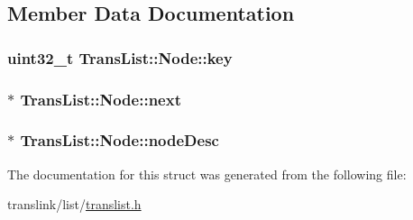 \subsection{Member Data Documentation}
\hypertarget{structTransList_1_1Node_a975055011359376eff958b309b0b553f}{
\subsubsection[{key}]{\setlength{\rightskip}{0pt plus 5cm}uint32\-\_\-t Trans\-List\-::\-Node\-::key}}\label{structTransList_1_1Node_a975055011359376eff958b309b0b553f}
\hypertarget{structTransList_1_1Node_a83d6cb167c08aab2d73488e3d6cb437f}{
\subsubsection[{next}]{$\ast$ Trans\-List\-::\-Node\-::next}}\label{structTransList_1_1Node_a83d6cb167c08aab2d73488e3d6cb437f}
\hypertarget{structTransList_1_1Node_a2bec17b9f73ed89160a4dfcf12418bb5}{
\subsubsection[{node\-Desc}]{$\ast$ Trans\-List\-::\-Node\-::node\-Desc}}\label{structTransList_1_1Node_a2bec17b9f73ed89160a4dfcf12418bb5}


The documentation for this struct was generated from the following file\-:\begin{DoxyCompactItemize}
\item 
translink/list/\hyperlink{translist_8h}{translist.\-h}\end{DoxyCompactItemize}

